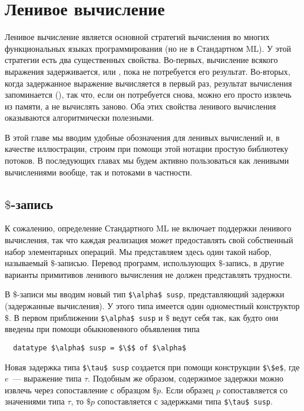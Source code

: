 \chapter{Ленивое вычисление}
\label{ch:4}

Ленивое вычисление является основной стратегий вычисления во многих
функциональных языках программирования (но не в Стандартном ML). У
этой стратегии есть два существенных свойства. Во-первых, вычисление
всякого выражения задерживается, или ,
пока не потребуется его результат. Во-вторых, когда задержанное
выражение вычисляется в первый раз, результат вычисления запоминается
(), так что, если он потребуется снова,
можно его просто извлечь из памяти, а не вычислять заново. Оба этих свойства
ленивого вычисления оказываются алгоритмически полезными.

В этой главе мы вводим удобные обозначения для ленивых вычислений и, в
качестве иллюстрации, строим при помощи этой нотации простую
библиотеку потоков. В последующих главах мы будем активно пользоваться
как ленивыми вычислениями вообще, так и потоками в частности.

\section{$\$$-запись}
\label{sc:4.1}

К сожалению, определение Стандартного ML \cite{Milner-etal1997} не
включает поддержки ленивого вычисления, так что каждая реализация
может предоставлять свой собственный набор элементарных операций.
Мы представляем здесь один такой набор,
называемый $\$$-записью.  Перевод программ, использующих
$\$$-запись, в другие варианты примитивов ленивого вычисления не
должен представлять трудности.

В $\$$-записи мы вводим новый тип \lstinline!$\alpha$ susp!,
представляющий задержки (задержанные вычисления). У этого типа имеется один
одноместный конструктор $\$$. В первом приближении
\lstinline!$\alpha$ susp! и $\$$ ведут себя так, как будто они введены при помощи
обыкновенного объявления типа
\begin{lstlisting}
  datatype $\alpha$ susp = $\$$ of $\alpha$
\end{lstlisting}
Новая задержка типа \lstinline!$\tau$ susp! создается
при помощи конструкции \lstinline!$\$e$!, где $e$~---
выражение типа $\tau$. Подобным же образом, содержимое задержки можно
извлечь через сопоставление с образцом
$\$p$. Если образец $p$ сопоставляется со значениями типа $\tau$, то
$\$p$ сопоставляется с задержками типа
\lstinline!$\tau$ susp!.

